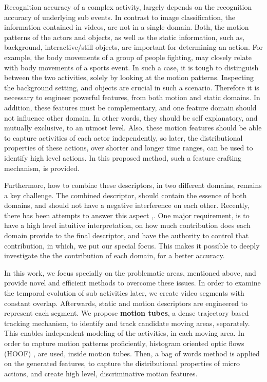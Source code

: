 Recognition accuracy of a complex activity, largely depends on the recognition accuracy
of underlying sub events. In contrast to image classification, the information contained in videos,
are not
 in a single domain. Both, the motion patterns of the actors and objects, as well as the static
 information, such as, background, interactive/still objects, are important for determining an action.
For example, the body movements of a group of people fighting, may closely relate with
body movements of a sports event. In such a case, it is tough to distinguish between the two
activities, solely by looking at the motion patterns. Inspecting the background setting,
and objects are crucial in such a scenario. Therefore it is necessary to engineer powerful features,
from both motion and static domains. In addition, these features must be complementary, and one feature domain should
not influence other domain. In other words, they should be self explanatory, and mutually exclusive, to an utmost level.
Also, these motion features should be able to capture
activities of each actor independently, so later, the distributional properties of these actions, over shorter
and longer time ranges, can be used to identify high level actions. In this proposed method, such a feature crafting mechanism, is provided.

Furthermore, how to combine these descriptors, in two different domains, remains a key challenge.
The combined descriptor, should contain the essence of both domains, and should not have a
negative interference on each other. Recently, there has been attempts to answer this aspect \cite{7486474},\cite{simonyan2014two}.
One major requirement, is to
have a high level intuitive interpretation, on how much contribution does each domain provide to the
final descriptor, and have the authority to control that contribution, in which, we put
our special focus. This makes it possible
to deeply investigate the the contribution of each domain, for a better accuracy.

In this work, we focus specially on the problematic areas, mentioned above, and provide
novel and efficient methods to overcome these issues. In order to examine the temporal evolution
of sub activities later, we create video segments with constant overlap. Afterwards, static and motion
descriptors are engineered to represent each segment. We propose \textbf{motion tubes},
a dense trajectory \cite{wang2011action} based tracking mechanism, to identify and track candidate moving areas,
separately. This enables independent modeling of the activities, in each moving area.
In order to capture motion patterns proficiently, histogram oriented optic flows (HOOF) \cite{chaudhry2009histograms}
, are used, inside motion tubes. Then, a bag of words method is applied on the generated
features, to capture the distributional properties of micro actions, and create high level, discriminative motion features.

